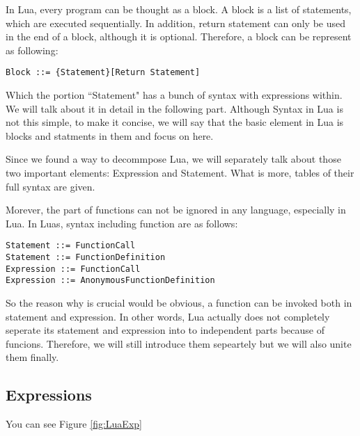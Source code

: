 \documentclass{article}
\begin{document}
In Lua, every program can be thought as a block. A block is a list of statements, which are executed sequentially. In addition, return statement can only be used in the end of a block, although it is optional. Therefore, a block can be represent as following:
\begin{center}
\tt Block ::= \{Statement\}[Return Statement]\\ 
\end{center}
Which the portion ``Statement" has a bunch of syntax with expressions within. We will talk about it in detail in the following part. Although Syntax in Lua is not this simple, to make it concise, we will say that the basic element in Lua is blocks and statments in them and focus on here.

Since we found a way to decommpose Lua, we will separately talk about those two important elements: Expression and Statement. What is more, tables of their full syntax are given.

Morever, the part of functions can not be ignored in any language, especially in Lua. In Luas, syntax including function are as follows:
\begin{center}
\tt Statement ::= FunctionCall\\ 
\tt Statement ::= FunctionDefinition\\ 
\tt Expression ::= FunctionCall\\ 
\tt Expression ::= AnonymousFunctionDefinition\\ 
\end{center}
So the reason why is crucial would be obvious, a function can be invoked both in statement and expression. In other words, Lua actually does not completely seperate its statement and expression into to independent parts because of funcions. Therefore, we will still introduce them sepeartely but we will also unite them finally.



\subsection{Expressions}
You can see Figure \ref{fig:LuaExp}


\newcommand{\mydefhead}[2]{\multicolumn{2}{l}{{#1}}&\mbox{\emph{#2}}\\}
\newcommand{\mydefcase}[2]{\qquad\qquad& #1 &\mbox{#2}\\}

\newcommand{\functiondef}[2]{\mbox{\tt function}~(\overline{#1_i})~#2~ {\tt end}}
\end{document}
